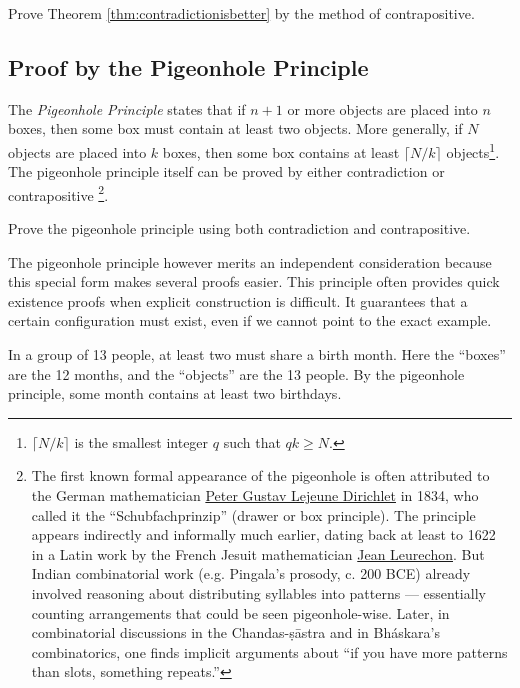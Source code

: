 \begin{exercise}
Prove Theorem \ref{thm:contradictionisbetter} by the method of contrapositive.
\end{exercise}

\subsection{Proof by the Pigeonhole Principle}

The \emph{Pigeonhole Principle} states that if $n+1$ or more objects are placed
into $n$ boxes, then some box must contain at least two objects. More generally,
if $N$ objects are placed into $k$ boxes, then some box contains at least
$\lceil N/k \rceil$ objects\footnote{$\lceil N/k \rceil$ is the smallest integer $q$ such that 
$qk \ge N$.}. The pigeonhole principle itself can be proved by either contradiction or contrapositive \footnote{The first known formal appearance  of the pigeonhole is often attributed to the German mathematician \href{https://en.wikipedia.org/wiki/Peter\_Gustav\_Lejeune\_Dirichlet}{Peter Gustav Lejeune Dirichlet} in 1834, who called it the “Schubfachprinzip” (drawer or box principle). The principle appears indirectly and informally much earlier, dating back at least to 1622 in a Latin work by the French Jesuit mathematician \href{https://en.wikipedia.org/wiki/Jean\_Leurechon}{Jean Leurechon}. But Indian combinatorial work (e.g. Pingala’s prosody, c. 200 BCE) already involved reasoning about distributing syllables into patterns — essentially counting arrangements that could be seen pigeonhole-wise. Later, in combinatorial discussions in the Chandas-\d{s}\={a}stra and in   Bh\'{a}skara’s combinatorics, one finds implicit arguments about  ``if you have more patterns than slots, something repeats.''}. 

\begin{exercise}
Prove the pigeonhole principle using both contradiction and contrapositive.
\end{exercise}

The pigeonhole principle however merits an independent consideration because this special form makes several proofs easier.
 This principle often provides quick existence proofs when explicit construction
is difficult. It guarantees that a certain configuration must exist, even if we
cannot point to the exact example.

\begin{example}
In a group of 13 people, at least two must share a birth month. Here the ``boxes'' are the 12 months, and the ``objects'' are the 13
people. By the pigeonhole principle, some month contains at least two birthdays.
\end{example}

